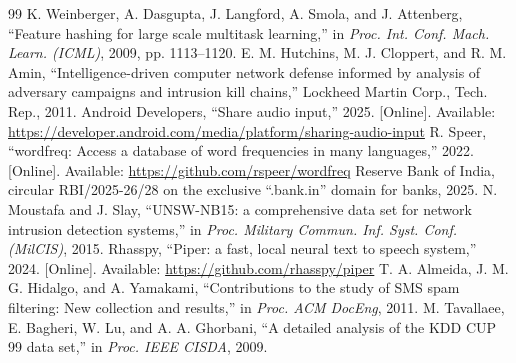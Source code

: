 \documentclass[conference]{IEEEtran}
\begin{document}
\begin{thebibliography}{99}
 K. Weinberger, A. Dasgupta, J. Langford, A. Smola, and J. Attenberg, ``Feature hashing for large scale multitask learning,'' in \emph{Proc. Int. Conf. Mach. Learn. (ICML)}, 2009, pp. 1113--1120.
 E. M. Hutchins, M. J. Cloppert, and R. M. Amin, ``Intelligence-driven computer network defense informed by analysis of adversary campaigns and intrusion kill chains,'' Lockheed Martin Corp., Tech. Rep., 2011.
 Android Developers, ``Share audio input,'' 2025. [Online]. Available: \url{https://developer.android.com/media/platform/sharing-audio-input}
 R. Speer, ``wordfreq: Access a database of word frequencies in many languages,'' 2022. [Online]. Available: \url{https://github.com/rspeer/wordfreq}
 Reserve Bank of India, circular RBI/2025-26/28 on the exclusive ``.bank.in'' domain for banks, 2025.
 N. Moustafa and J. Slay, ``UNSW-NB15: a comprehensive data set for network intrusion detection systems,'' in \emph{Proc. Military Commun. Inf. Syst. Conf. (MilCIS)}, 2015.
 Rhasspy, ``Piper: a fast, local neural text to speech system,'' 2024. [Online]. Available: \url{https://github.com/rhasspy/piper}
 T. A. Almeida, J. M. G. Hidalgo, and A. Yamakami, ``Contributions to the study of SMS spam filtering: New collection and results,'' in \emph{Proc. ACM DocEng}, 2011.
 M. Tavallaee, E. Bagheri, W. Lu, and A. A. Ghorbani, ``A detailed analysis of the KDD CUP 99 data set,'' in \emph{Proc. IEEE CISDA}, 2009.
\end{thebibliography}
\end{document}
